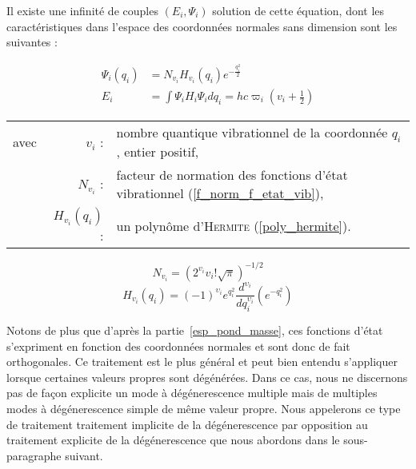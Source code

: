  Il existe une infinité de couples $(E_i, \Psi_i)$ solution de cette équation, dont les caractéristiques dans l'espace des coordonnées normales sans dimension sont les suivantes :
 
\begin{align}
	\Psi_i\left(q_i\right) &= N_{v_i} H_{v_i} \left(q_i\right) e^{-\frac{q^2_i}{2}} \\
	E_i &= \int \Psi_i H_i \Psi_i dq_i = hc \varpi_i\left(v_i + \frac{1}{2}\right)
\end{align}
\begin{flushleft}
\begin{tabular}{@{}lrp{10cm}}
avec & $v_i$ : & nombre quantique vibrationnel de la coordonnée $q_i$, entier positif,\\
 & $N_{v_i}$ : & facteur de normation des fonctions d'état vibrationnel (\ref{f_norm_f_etat_vib}),\\
 & $H_{v_i}(q_i)$ : & un polynôme d'\textsc{Hermite} (\ref{poly_hermite}).\\
\end{tabular}
\end{flushleft}

\begin{equation}
N_{v_i} = \left(2^{v_i} v_i ! \sqrt{\pi} \right)^{-1/2}
\label{f_norm_f_etat_vib}
\end{equation}
\begin{equation}
H_{v_i}(q_i) = (-1)^{\upsilon_i} e^{q_{i}^{2}} \frac{d^{\upsilon_i}}{dq_{i}^{\upsilon_i}} \left(e^{-q_{i}^{2}} \right)
\label{poly_hermite}
\end{equation}

Notons de plus que d'après la partie~\ref{esp_pond_masse}, ces fonctions d'état s'expriment en fonction des coordonnées normales et sont donc de fait orthogonales.
Ce traitement est le plus général et peut bien entendu s'appliquer lorsque certaines valeurs propres sont dégénérées. Dans ce cas, nous ne discernons pas de façon explicite un mode à dégénerescence multiple mais de multiples modes à dégénerescence simple de même valeur propre. Nous appelerons ce type de traitement \og traitement implicite de la dégénerescence\fg{} par opposition au \og traitement explicite de la dégénerescence \fg{} que nous abordons dans le sous-paragraphe suivant.




